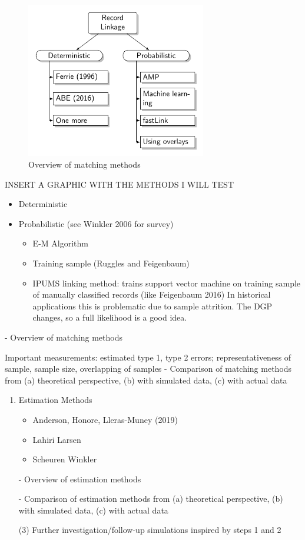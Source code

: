 \documentclass[12pt]{article}
\begin{document}
\begin{figure}[h!]
\centering
\caption{Overview of matching methods}
\includegraphics[width=0.7\textwidth]{./RecordLinkageGraphics.pdf}
\end{figure}

INSERT A GRAPHIC WITH THE METHODS I WILL TEST
\begin{itemize}
\item Deterministic
\item Probabilistic  (see Winkler 2006 for survey)
\begin{itemize}
\item E-M Algorithm
\item Training sample (Ruggles and Feigenbaum)
\item IPUMS linking method:  trains support vector machine on training sample of manually classified records (like Feigenbaum 2016)  In historical applications this is problematic due to sample attrition.  The DGP changes, so a full likelihood is a good idea. 
\end{itemize}
\end{itemize}
- Overview of matching methods

Important measurements:  estimated type 1, type 2 errors; representativeness of sample, sample size, overlapping of samples 
- Comparison of matching methods from (a) theoretical perspective, (b) with simulated data, (c) with actual data
\begin{enumerate}
\item  Estimation Methods 
\begin{itemize}
\item Anderson, Honore, Lleras-Muney (2019)
\item Lahiri Larsen
\item Scheuren Winkler 
\end{itemize}
- Overview of estimation methods


- Comparison of estimation methods from (a) theoretical perspective, (b) with simulated data, (c) with actual data

(3) Further investigation/follow-up simulations inspired by steps 1 and 2  
\end{enumerate}
\end{document}
